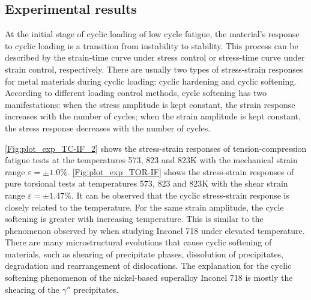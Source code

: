 \subsection{Experimental results}
\noindent
At the initial stage of cyclic loading of low cycle fatigue, the material's response to cyclic loading is a transition from instability to stability.
This process can be described by the strain-time curve under stress control or stress-time curve under strain control, respectively.
There are usually two types of stress-strain responses for metal materials during cyclic loading: cyclic hardening and cyclic softening.
According to different loading control methods, cycle softening has two manifestations: when the stress amplitude is kept constant, the strain response increases with the number of cycles; when the strain amplitude is kept constant, the stress response decreases with the number of cycles.

\ref{Fig:plot_exp_TC-IF_2} shows the stress-strain responses of tension-compression fatigue tests at the temperatures 573, 823 and 823K with the mechanical strain range $\varepsilon=\pm1.0\%$. \ref{Fig:plot_exp_TOR-IF} shows the stress-strain responses of pure torsional tests at temperatures 573, 823 and 823K with the shear strain range $\varepsilon=\pm1.47\%$. It can be observed that the cyclic stress-strain response is closely related to the temperature. For the same strain amplitude, the cycle softening is greater with increasing temperature. This is similar to the phenomenon observed by \cite{Fournier1977,Xiao2005,kim1988elevated,Schlesinger2017} when studying Inconel 718 under elevated temperature.
There are many microstructural evolutions that cause cyclic softening of materials, such as shearing of precipitate phases, dissolution of precipitates, degradation and rearrangement of dislocations.
The explanation for the cyclic softening phenomenon of the nickel-based superalloy Inconel 718 is mostly the shearing of the $\gamma ''$ precipitates.


